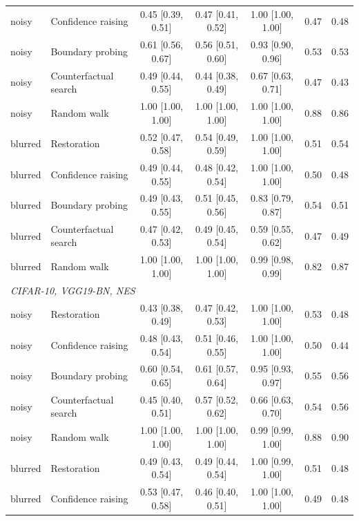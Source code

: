 \begin{landscape}
\begin{footnotesize}
\begin{longtable}{@{\extracolsep{\fill}}llccccc@{}}
\quad noisy & Confidence raising & 0.45 {[}0.39, 0.51{]} & 0.47 {[}0.41, 0.52{]} & 1.00 {[}1.00, 1.00{]} & 0.47 & 0.48 \\
\quad noisy & Boundary probing & 0.61 {[}0.56, 0.67{]} & 0.56 {[}0.51, 0.60{]} & 0.93 {[}0.90, 0.96{]} & 0.53 & 0.53 \\
\quad noisy & Counterfactual search & 0.49 {[}0.44, 0.55{]} & 0.44 {[}0.38, 0.49{]} & 0.67 {[}0.63, 0.71{]} & 0.47 & 0.43 \\
\quad noisy & Random walk & 1.00 {[}1.00, 1.00{]} & 1.00 {[}1.00, 1.00{]} & 1.00 {[}1.00, 1.00{]} & 0.88 & 0.86 \\
\quad blurred & Restoration & 0.52 {[}0.47, 0.58{]} & 0.54 {[}0.49, 0.59{]} & 1.00 {[}1.00, 1.00{]} & 0.51 & 0.54 \\
\quad blurred & Confidence raising & 0.49 {[}0.44, 0.55{]} & 0.48 {[}0.42, 0.54{]} & 1.00 {[}1.00, 1.00{]} & 0.50 & 0.48 \\
\quad blurred & Boundary probing & 0.49 {[}0.43, 0.55{]} & 0.51 {[}0.45, 0.56{]} & 0.83 {[}0.79, 0.87{]} & 0.54 & 0.51 \\
\quad blurred & Counterfactual search & 0.47 {[}0.42, 0.53{]} & 0.49 {[}0.45, 0.54{]} & 0.59 {[}0.55, 0.62{]} & 0.47 & 0.49 \\
\quad blurred & Random walk & 1.00 {[}1.00, 1.00{]} & 1.00 {[}1.00, 1.00{]} & 0.99 {[}0.98, 0.99{]} & 0.82 & 0.87 \\
\multicolumn{7}{l}{\emph{CIFAR-10, VGG19-BN, NES}} \\
\quad noisy & Restoration & 0.43 {[}0.38, 0.49{]} & 0.47 {[}0.42, 0.53{]} & 1.00 {[}1.00, 1.00{]} & 0.53 & 0.48 \\
\quad noisy & Confidence raising & 0.48 {[}0.43, 0.54{]} & 0.51 {[}0.46, 0.55{]} & 1.00 {[}1.00, 1.00{]} & 0.50 & 0.44 \\
\quad noisy & Boundary probing & 0.60 {[}0.54, 0.65{]} & 0.61 {[}0.57, 0.64{]} & 0.95 {[}0.93, 0.97{]} & 0.55 & 0.56 \\
\quad noisy & Counterfactual search & 0.45 {[}0.40, 0.51{]} & 0.57 {[}0.52, 0.62{]} & 0.66 {[}0.63, 0.70{]} & 0.54 & 0.56 \\
\quad noisy & Random walk & 1.00 {[}1.00, 1.00{]} & 1.00 {[}1.00, 1.00{]} & 0.99 {[}0.99, 1.00{]} & 0.88 & 0.90 \\
\quad blurred & Restoration & 0.49 {[}0.43, 0.54{]} & 0.49 {[}0.44, 0.54{]} & 1.00 {[}0.99, 1.00{]} & 0.51 & 0.48 \\
\quad blurred & Confidence raising & 0.53 {[}0.47, 0.58{]} & 0.46 {[}0.40, 0.51{]} & 1.00 {[}1.00, 1.00{]} & 0.49 & 0.48 \\

\end{longtable}
\end{footnotesize}
\end{landscape}

